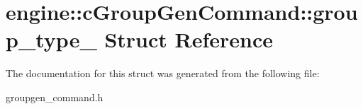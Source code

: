 \hypertarget{structengine_1_1cGroupGenCommand_1_1group__type__}{
\section{engine\-:\-:c\-Group\-Gen\-Command\-:\-:group\-\_\-type\-\_\- \-Struct \-Reference}
\label{structengine_1_1cGroupGenCommand_1_1group__type__}
}


\-The documentation for this struct was generated from the following file\-:\begin{DoxyCompactItemize}
\item 
groupgen\-\_\-command.\-h\end{DoxyCompactItemize}
